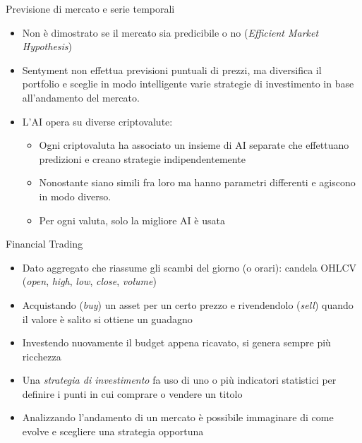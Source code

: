 \documentclass{beamer}
\begin{document}
\begin{frame}{Previsione di mercato e serie temporali}
\begin{itemize}
\item Non è dimostrato se il mercato sia predicibile o no (\textit{Efficient Market Hypothesis})
\item Sentyment non effettua previsioni puntuali di prezzi, ma diversifica il portfolio e sceglie in modo intelligente varie strategie di investimento in base all'andamento del mercato.
\item L'AI opera su diverse criptovalute:
\begin{itemize}
    \item Ogni criptovaluta ha associato un insieme di AI separate che effettuano predizioni e creano strategie indipendentemente
    \item Nonostante siano simili fra loro ma hanno parametri differenti e agiscono in modo diverso.
    \item Per ogni valuta, solo la migliore AI è usata
\end{itemize}
\end{itemize}
\end{frame}

\begin{frame}{Financial Trading}
\begin{itemize}
    \item Dato aggregato che riassume gli scambi del giorno (o orari): candela OHLCV (\textit{open}, \textit{high},     \textit{low}, \textit{close}, \textit{volume})
    \item Acquistando (\textit{buy}) un asset per un certo prezzo e rivendendolo (\textit{sell}) quando il valore è salito si ottiene un guadagno
    \item Investendo nuovamente il budget appena ricavato, si genera sempre più ricchezza
    \item Una \textit{strategia di investimento} fa uso di uno o più indicatori statistici per definire i punti in cui comprare o vendere un titolo
    \item Analizzando l'andamento di un mercato è possibile immaginare di come evolve e scegliere una strategia opportuna
    \begin{figure}
\end{figure}
\end{itemize}
\end{frame}
\end{document}
